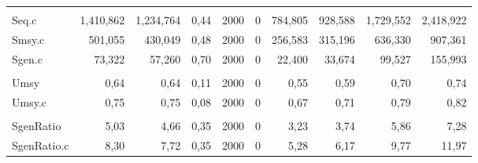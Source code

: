 \documentclass[french,11pt]{book}
\begin{document}
\begin{longtable}[t]{lrrrrrrrrr}
\midrule\\ Seq.c & 1,410,862 & 1,234,764 & 0,44 & 2000 & 0 & 784,805 & 928,588 & 1,729,552 & 2,418,922\\ Smsy.c & 501,055 & 430,049 & 0,48 & 2000 & 0 & 256,583 & 315,196 & 636,330 & 907,361\\ Sgen.c & 73,322 & 57,260 & 0,70 & 2000 & 0 & 22,400 & 33,674 & 99,527 & 155,993\\
\midrule\\ Umsy & 0,64 & 0,64 & 0,11 & 2000 & 0 & 0,55 & 0,59 & 0,70 & 0,74\\ Umsy.c & 0,75 & 0,75 & 0,08 & 2000 & 0 & 0,67 & 0,71 & 0,79 & 0,82\\
\midrule\\ SgenRatio & 5,03 & 4,66 & 0,35 & 2000 & 0 & 3,23 & 3,74 & 5,86 & 7,28\\ SgenRatio.c & 8,30 & 7,72 & 0,35 & 2000 & 0 & 5,28 & 6,17 & 9,77 & 11,97\\* \end{longtable}

\endgroup{} \endgroup{}
\end{document}
